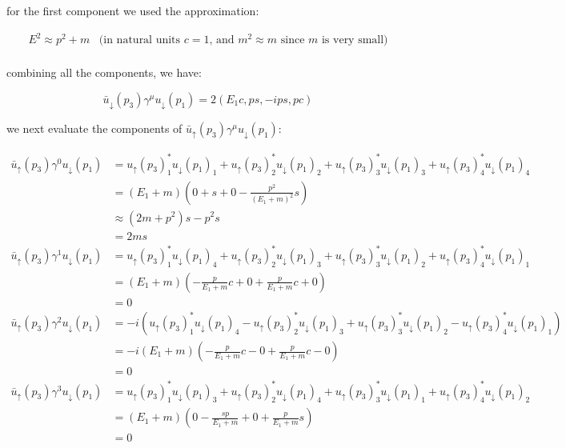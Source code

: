 \documentclass[11pt]{article}
\theoremstyle{definition}
\begin{document}
for the first component we used the approximation:

\begin{align}
    E^2 \approx p^2 + m \;\;\; \text{(in natural units $c=1$, and $m^2\approx m$ since $m$ is very small)}\\
\end{align}

combining all the components, we have:

\begin{equation}
\boxed{
    \bar{u}_{\downarrow}(p_3)\gamma^{\mu}u_{\downarrow}(p_1) = 
    2(E_1c, ps, -ips, pc)
}
\end{equation}

we next evaluate the components of $\bar{u}_{\uparrow}(p_3)\gamma^{\mu}u_{\downarrow}(p_1)$:

\begin{align}
    \bar{u}_{\uparrow}(p_3)\gamma^{0}u_{\downarrow}(p_1)
    &=
    u_{\uparrow}(p_3)_1^*u_{\downarrow}(p_1)_1 + u_{\uparrow}(p_3)_2^*u_{\downarrow}(p_1)_2 + u_{\uparrow}(p_3)_3^*u_{\downarrow}(p_1)_3 + u_{\uparrow}(p_3)_4^*u_{\downarrow}(p_1)_4\\
    &= (E_1+m)\left( 0 + s + 0 -\frac{p^2}{(E_1+m)^2}s\right)\\
    &\approx (2m+p^2)s - p^2s\\
    &= 2ms\\
    \bar{u}_{\uparrow}(p_3)\gamma^{1}u_{\downarrow}(p_1)
    &=
    u_{\uparrow}(p_3)_1^*u_{\downarrow}(p_1)_4 + u_{\uparrow}(p_3)_2^*u_{\downarrow}(p_1)_3 + u_{\uparrow}(p_3)_3^*u_{\downarrow}(p_1)_2 + u_{\uparrow}(p_3)_4^*u_{\downarrow}(p_1)_1\\
    &= (E_1+m) \left( -\frac{p}{E_1+m}c + 0 + \frac{p}{E_1+m}c + 0 \right)\\
    &= 0\\
    \bar{u}_{\uparrow}(p_3)\gamma^{2}u_{\downarrow}(p_1)
    &=
    -i(u_{\uparrow}(p_3)_1^*u_{\downarrow}(p_1)_4 - u_{\uparrow}(p_3)_2^*u_{\downarrow}(p_1)_3 + u_{\uparrow}(p_3)_3^*u_{\downarrow}(p_1)_2 - u_{\uparrow}(p_3)_4^*u_{\downarrow}(p_1)_1)\\
    &= -i(E_1+m)\left( -\frac{p}{E_1+m}c - 0 + \frac{p}{E_1+m}c - 0  \right)\\
    &= 0\\
    \bar{u}_{\uparrow}(p_3)\gamma^{3}u_{\downarrow}(p_1)
    &=
    u_{\uparrow}(p_3)_1^*u_{\downarrow}(p_1)_3 + u_{\uparrow}(p_3)_2^*u_{\downarrow}(p_1)_4 + u_{\uparrow}(p_3)_3^*u_{\downarrow}(p_1)_1 + u_{\uparrow}(p_3)_4^*u_{\downarrow}(p_1)_2\\
    &=(E_1+m) \left( 0 -\frac{sp}{E_1+m} + 0 + \frac{p}{E_1+m}s  \right)\\
    &= 0
\end{align}
\end{document}
